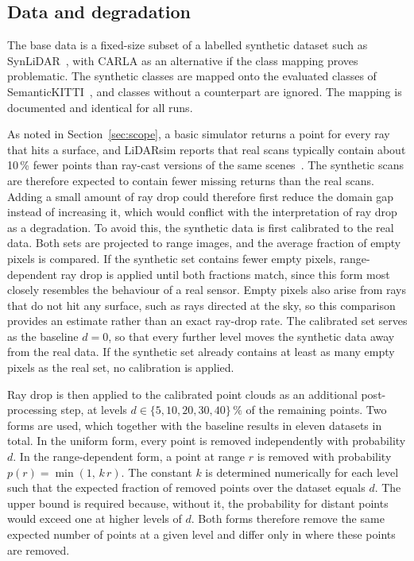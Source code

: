 \subsection{Data and degradation}\label{sec:data}
The base data is a fixed-size subset of a labelled synthetic dataset such as SynLiDAR~\cite{xiaoTransferLearningSynthetic2022}, with CARLA as an alternative if the class mapping proves problematic. The synthetic classes are mapped onto the evaluated classes of SemanticKITTI~\cite{behleySemanticKITTIDatasetSemantic2019a}, and classes without a counterpart are ignored. The mapping is documented and identical for all runs.

As noted in Section~\ref{sec:scope}, a basic simulator returns a point for every ray that hits a surface, and LiDARsim reports that real scans typically contain about 10\,\% fewer points than ray-cast versions of the same scenes~\cite{manivasagamLiDARsimRealisticLiDAR2020a}. The synthetic scans are therefore expected to contain fewer missing returns than the real scans. Adding a small amount of ray drop could therefore first reduce the domain gap instead of increasing it, which would conflict with the interpretation of ray drop as a degradation. To avoid this, the synthetic data is first calibrated to the real data. Both sets are projected to range images, and the average fraction of empty pixels is compared. If the synthetic set contains fewer empty pixels, range-dependent ray drop is applied until both fractions match, since this form most closely resembles the behaviour of a real sensor. Empty pixels also arise from rays that do not hit any surface, such as rays directed at the sky, so this comparison provides an estimate rather than an exact ray-drop rate. The calibrated set serves as the baseline $d=0$, so that every further level moves the synthetic data away from the real data. If the synthetic set already contains at least as many empty pixels as the real set, no calibration is applied.

Ray drop is then applied to the calibrated point clouds as an additional post-processing step, at levels $d \in \{5, 10, 20, 30, 40\}\,\%$ of the remaining points. Two forms are used, which together with the baseline results in eleven datasets in total. In the uniform form, every point is removed independently with probability $d$. In the range-dependent form, a point at range $r$ is removed with probability $p(r)=\min(1,\,k\,r)$. The constant $k$ is determined numerically for each level such that the expected fraction of removed points over the dataset equals $d$. The upper bound is required because, without it, the probability for distant points would exceed one at higher levels of $d$. Both forms therefore remove the same expected number of points at a given level and differ only in where these points are removed.

